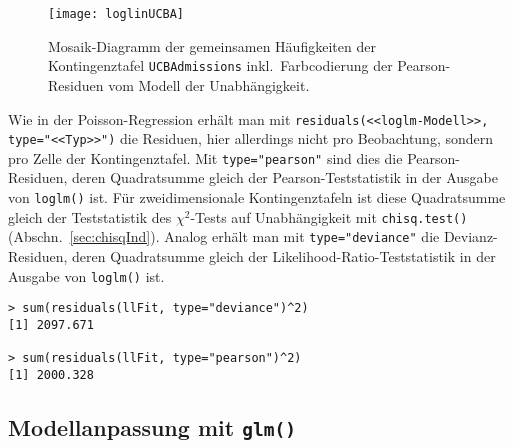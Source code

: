 \begin{figure}[ht]
\centering
\texttt{[image: loglinUCBA]}
\vspace*{-1em}
\caption{Mosaik-Diagramm der gemeinsamen Häufigkeiten der Kontingenztafel \lstinline!UCBAdmissions! inkl.\ Farbcodierung der Pearson-Residuen vom Modell der Unabhängigkeit.}
\label{fig:loglinUCBA}
\end{figure}

Wie in der Poisson-Regression erhält man mit \lstinline!residuals(<<loglm-Modell>>, type="<<Typ>>")! die Residuen, hier allerdings nicht pro Beobachtung, sondern pro Zelle der Kontingenztafel. Mit \lstinline!type="pearson"! sind dies die Pearson-Residuen, deren Quadratsumme gleich der Pearson-Teststatistik in der Ausgabe von \lstinline!loglm()! ist. Für zweidimensionale Kontingenztafeln ist diese Quadratsumme gleich der Teststatistik des $\chi^{2}$-Tests auf Unabhängigkeit mit \lstinline!chisq.test()! (Abschn.\ \ref{sec:chisqInd}). Analog erhält man mit \lstinline!type="deviance"! die Devianz-Residuen, deren Quadratsumme gleich der Likelihood-Ratio-Teststatistik in der Ausgabe von \lstinline!loglm()! ist.
\begin{lstlisting}
> sum(residuals(llFit, type="deviance")^2)
[1] 2097.671

> sum(residuals(llFit, type="pearson")^2)
[1] 2000.328
\end{lstlisting}

\subsection{Modellanpassung mit \texttt{glm()}}
\label{sec:loglinGlmFit}

